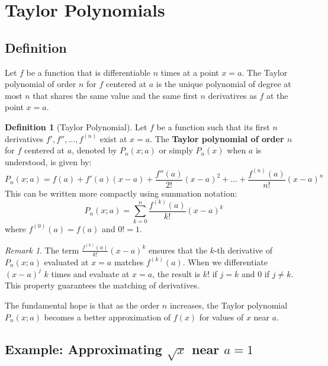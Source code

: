 \documentclass[11pt]{article}
\theoremstyle{definition}
\newtheorem{definition}[theorem]{Definition}
\theoremstyle{remark}
\newtheorem{remark}[theorem]{Remark}
\begin{document}
\section{Taylor Polynomials}

\subsection{Definition}

Let $f$ be a function that is differentiable $n$ times at a point $x=a$. The Taylor polynomial of order $n$ for $f$ centered at $a$ is the unique polynomial of degree at most $n$ that shares the same value and the same first $n$ derivatives as $f$ at the point $x=a$.

\begin{definition}[Taylor Polynomial]
Let $f$ be a function such that its first $n$ derivatives $f', f'', \dots, f^{(n)}$ exist at $x=a$. The \textbf{Taylor polynomial of order $n$} for $f$ centered at $a$, denoted by $P_n(x; a)$ or simply $P_n(x)$ when $a$ is understood, is given by:
\begin{equation}
P_n(x; a) = f(a) + f'(a)(x-a) + \frac{f''(a)}{2!}(x-a)^2 + \dots + \frac{f^{(n)}(a)}{n!}(x-a)^n
\end{equation}
This can be written more compactly using summation notation:
\begin{equation} \label{eq:taylor_poly_def}
P_n(x; a) = \sum_{k=0}^n \frac{f^{(k)}(a)}{k!}(x-a)^k
\end{equation}
where $f^{(0)}(a) = f(a)$ and $0! = 1$.
\end{definition}

\begin{remark}
The term $\frac{f^{(k)}(a)}{k!}(x-a)^k$ ensures that the $k$-th derivative of $P_n(x; a)$ evaluated at $x=a$ matches $f^{(k)}(a)$. When we differentiate $(x-a)^j$ $k$ times and evaluate at $x=a$, the result is $k!$ if $j=k$ and $0$ if $j \neq k$. This property guarantees the matching of derivatives.
\end{remark}

The fundamental hope is that as the order $n$ increases, the Taylor polynomial $P_n(x; a)$ becomes a better approximation of $f(x)$ for values of $x$ near $a$.

\subsection{Example: Approximating \texorpdfstring{$\sqrt{x}$}{sqrt(x)} near \texorpdfstring{$a=1$}{a=1}}
\end{document}
